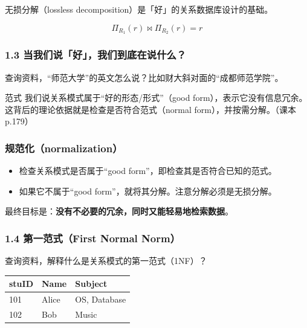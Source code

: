 \documentclass[aspectratio=169, 14pt]{beamer}
\begin{document}
{
\begin{frame}[standout]
	无损分解（lossless decomposition）是「好」的关系数据库设计的基础。

	\[\Pi_{R_1}(r) \Join  \Pi_{R_2}(r) = r\]
\end{frame}
}

\begin{frame}
	\frametitle{1.3 当我们说「好」，我们到底在说什么？}

	 查询资料，“师范大学”的英文怎么说？比如财大斜对面的“成都师范学院”。

	\pause
	\begin{exampleblock}{范式}
		我们说关系模式属于“好的形态/形式”（good form），表示它\alert{没有信息冗余}。这背后的理论依据就是检查是否符合\alert{范式}（normal form），并按需\alert{分解}。（课本p.179）
	\end{exampleblock}
\end{frame}

\begin{frame}
	\frametitle{规范化（normalization）}

	\begin{itemize}
		\item 检查关系模式是否属于“good form”，即检查其是否符合已知的范式。
		\item 如果它不属于“good form”，就将其分解。注意分解必须是无损分解。
	\end{itemize}

	 最终目标是：\textbf{没有不必要的冗余，同时又能轻易地检索数据}。
\end{frame}

\begin{frame}
	\frametitle{1.4 第一范式（First Normal Norm）}

	查询资料，解释什么是关系模式的\alert{第一范式}（1NF）？

	\begin{table}
		\begin{tabular}{lll}
			\toprule
			stuID & Name  & Subject      \\
			\midrule
			101   & Alice & OS, Database \\
			102   & Bob   & Music        \\
			\bottomrule
		\end{tabular}
	\end{table}


\end{frame}
\end{document}
